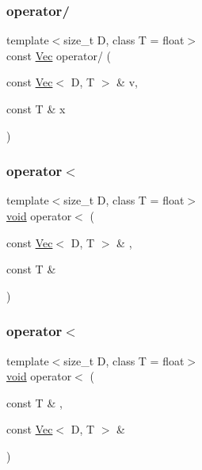 \subsubsection{\texorpdfstring{operator/}{operator/}\hspace{0.1cm}{\footnotesize\ttfamily [2/2]}}
{\footnotesize\ttfamily template$<$size\+\_\+t D, class T = float$>$ \\
const \hyperlink{classtrimesh_1_1Vec}{Vec} operator/ (\begin{DoxyParamCaption}\item[{const \hyperlink{classtrimesh_1_1Vec}{Vec}$<$ D, T $>$ \&}]{v,  }\item[{const T \&}]{x }\end{DoxyParamCaption})\hspace{0.3cm}{\ttfamily [friend]}}

\mbox{\label{classtrimesh_1_1Vec_a2696c58b327e6affbb8f068557d7c05b}} 
\subsubsection{\texorpdfstring{operator$<$}{operator<}\hspace{0.1cm}{\footnotesize\ttfamily [1/2]}}
{\footnotesize\ttfamily template$<$size\+\_\+t D, class T = float$>$ \\
\hyperlink{namespacetrimesh_a784ddfd979e1c579bda795a8edfc3f43}{void} operator$<$ (\begin{DoxyParamCaption}\item[{const \hyperlink{classtrimesh_1_1Vec}{Vec}$<$ D, T $>$ \&}]{,  }\item[{const T \&}]{ }\end{DoxyParamCaption})\hspace{0.3cm}{\ttfamily [friend]}}

\mbox{\label{classtrimesh_1_1Vec_affdb466b5a6cde5aeb0578429c2a87af}} 
\subsubsection{\texorpdfstring{operator$<$}{operator<}\hspace{0.1cm}{\footnotesize\ttfamily [2/2]}}
{\footnotesize\ttfamily template$<$size\+\_\+t D, class T = float$>$ \\
\hyperlink{namespacetrimesh_a784ddfd979e1c579bda795a8edfc3f43}{void} operator$<$ (\begin{DoxyParamCaption}\item[{const T \&}]{,  }\item[{const \hyperlink{classtrimesh_1_1Vec}{Vec}$<$ D, T $>$ \&}]{ }\end{DoxyParamCaption})\hspace{0.3cm}{\ttfamily [friend]}}

